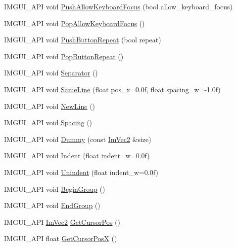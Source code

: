 \begin{DoxyCompactItemize}
\item 
I\+M\+G\+U\+I\+\_\+\+A\+PI void \hyperlink{namespace_im_gui_adf7c3cfdcbb06617bb70ff1526d064f4}{Push\+Allow\+Keyboard\+Focus} (bool allow\+\_\+keyboard\+\_\+focus)
\item 
I\+M\+G\+U\+I\+\_\+\+A\+PI void \hyperlink{namespace_im_gui_a017db69016de97685aec978e504dc96d}{Pop\+Allow\+Keyboard\+Focus} ()
\item 
I\+M\+G\+U\+I\+\_\+\+A\+PI void \hyperlink{namespace_im_gui_a61d3e0191d67bedaf45f0178f87e3125}{Push\+Button\+Repeat} (bool repeat)
\item 
I\+M\+G\+U\+I\+\_\+\+A\+PI void \hyperlink{namespace_im_gui_a0f883e8507be797ca8ba1448d2b9dbb0}{Pop\+Button\+Repeat} ()
\item 
I\+M\+G\+U\+I\+\_\+\+A\+PI void \hyperlink{namespace_im_gui_a191123597a5084d003c8beac7eeb029e}{Separator} ()
\item 
I\+M\+G\+U\+I\+\_\+\+A\+PI void \hyperlink{namespace_im_gui_a9a01bed1445b5b7edaf0af6a31c08d2c}{Same\+Line} (float pos\+\_\+x=0.\+0f, float spacing\+\_\+w=-\/1.\+0f)
\item 
I\+M\+G\+U\+I\+\_\+\+A\+PI void \hyperlink{namespace_im_gui_a77f8b0a33e5335f98661f99e720411da}{New\+Line} ()
\item 
I\+M\+G\+U\+I\+\_\+\+A\+PI void \hyperlink{namespace_im_gui_a2659e2bfe84b4cad0facd65d5c1ac90d}{Spacing} ()
\item 
I\+M\+G\+U\+I\+\_\+\+A\+PI void \hyperlink{namespace_im_gui_a8b0fb07113251301ff897b8578a53f34}{Dummy} (const \hyperlink{struct_im_vec2}{Im\+Vec2} \&size)
\item 
I\+M\+G\+U\+I\+\_\+\+A\+PI void \hyperlink{namespace_im_gui_a6c7b9f2d60951462eeebad80154a8926}{Indent} (float indent\+\_\+w=0.\+0f)
\item 
I\+M\+G\+U\+I\+\_\+\+A\+PI void \hyperlink{namespace_im_gui_ad577d36753634c9bbdc3750b0e5217f5}{Unindent} (float indent\+\_\+w=0.\+0f)
\item 
I\+M\+G\+U\+I\+\_\+\+A\+PI void \hyperlink{namespace_im_gui_a42407e196b7ed2a8755bff28aae9805f}{Begin\+Group} ()
\item 
I\+M\+G\+U\+I\+\_\+\+A\+PI void \hyperlink{namespace_im_gui_a05fc97fc64f28a55486087f503d9a622}{End\+Group} ()
\item 
I\+M\+G\+U\+I\+\_\+\+A\+PI \hyperlink{struct_im_vec2}{Im\+Vec2} \hyperlink{namespace_im_gui_a2fa4eb57e0f73b90e8edcd226a0cc7d5}{Get\+Cursor\+Pos} ()
\item 
I\+M\+G\+U\+I\+\_\+\+A\+PI float \hyperlink{namespace_im_gui_a022e32c808ac899e25847f4d65633b77}{Get\+Cursor\+PosX} ()

\end{DoxyCompactItemize}
